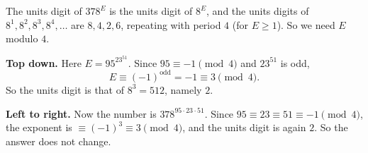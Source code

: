 The units digit of $378^E$ is the units digit of $8^E$, and the units digits of $8^1,8^2,8^3,8^4,\dots$ are $8,4,2,6$, repeating with period $4$ (for $E\ge1$). So we need $E$ modulo $4$.

\textbf{Top down.} Here $E=95^{23^{51}}$. Since $95\equiv-1\pmod4$ and $23^{51}$ is odd,
\[E\equiv(-1)^{\text{odd}}=-1\equiv3\pmod4 .\]
So the units digit is that of $8^3=512$, namely $\boxed{2}$.

\textbf{Left to right.} Now the number is $378^{95\cdot23\cdot51}$. Since $95\equiv23\equiv51\equiv-1\pmod4$, the exponent is $\equiv(-1)^3\equiv3\pmod4$, and the units digit is again $2$. So the answer does not change.
